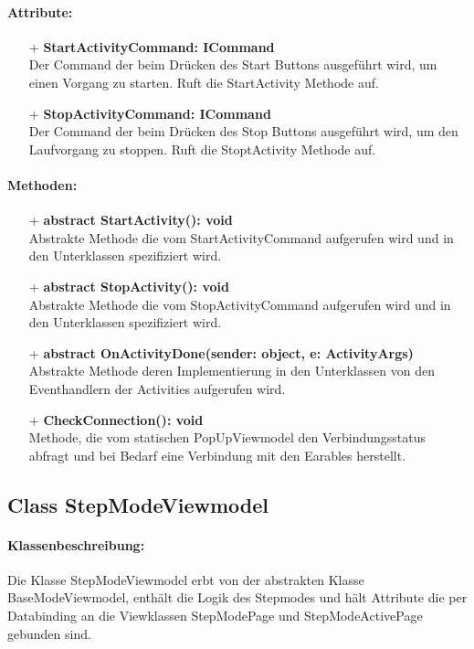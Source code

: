 \documentclass[a4paper,12pt]{article}
\begin{document}
\paragraph{Attribute:}
\begin{itemize}
	\item[+] \textbf{StartActivityCommand: ICommand} \\  Der Command der beim Drücken des Start Buttons ausgeführt wird, um einen Vorgang zu starten. Ruft die StartActivity Methode auf.
	\item[+] \textbf{StopActivityCommand: ICommand} \\ Der Command der beim Drücken des Stop Buttons ausgeführt wird, um den Laufvorgang zu stoppen. Ruft die StoptActivity Methode auf.
\end{itemize} 
\paragraph{Methoden:}
\begin{itemize}
	\item[+] \textbf{abstract StartActivity(): void} \\ Abstrakte Methode die vom StartActivityCommand aufgerufen wird und in den Unterklassen spezifiziert wird.
	\item[+] \textbf{abstract StopActivity(): void} \\ Abstrakte Methode die vom StopActivityCommand aufgerufen wird und in den Unterklassen spezifiziert wird.
	\item[+] \textbf{abstract OnActivityDone(sender: object, e: ActivityArgs)} \\ Abstrakte Methode deren Implementierung in den Unterklassen von den Eventhandlern der Activities aufgerufen wird.
	\item[+] \textbf{CheckConnection(): void} \\ Methode, die vom statischen PopUpViewmodel den Verbindungsstatus abfragt und bei Bedarf eine Verbindung mit den \Gls{Earables} herstellt.
\end{itemize}


\subsection{Class StepModeViewmodel}

\paragraph{Klassenbeschreibung:}
Die Klasse StepModeViewmodel erbt von der abstrakten Klasse BaseModeViewmodel, enthält die Logik des Stepmodes  und hält Attribute die per Databinding an die Viewklassen StepModePage und StepModeActivePage gebunden sind. 
\end{document}
